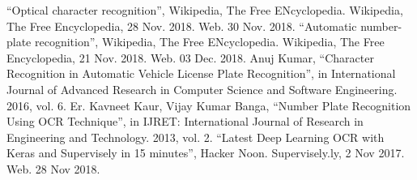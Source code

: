 \documentclass[conference]{IEEEtran}
\begin{document}
\begin{thebibliography}{00}
 “Optical character recognition”, Wikipedia, The Free ENcyclopedia. Wikipedia, The Free Encyclopedia, 28 Nov. 2018. Web. 30 Nov. 2018.
 “Automatic number-plate recognition”, Wikipedia, The Free ENcyclopedia. Wikipedia, The Free Encyclopedia, 21 Nov. 2018. Web. 03 Dec. 2018.
 Anuj Kumar, “Character Recognition in Automatic Vehicle License Plate Recognition”, in International Journal of Advanced Research in Computer Science and Software Engineering. 2016, vol. 6.
 Er. Kavneet Kaur, Vijay Kumar Banga, “Number Plate Recognition Using OCR Technique”, in IJRET: International Journal of Research in Engineering and Technology. 2013, vol. 2.
 “Latest Deep Learning OCR with Keras and Supervisely in 15 minutes”, Hacker Noon. Supervisely.ly, 2 Nov 2017. Web. 28 Nov 2018.
\end{thebibliography}
\end{document}
